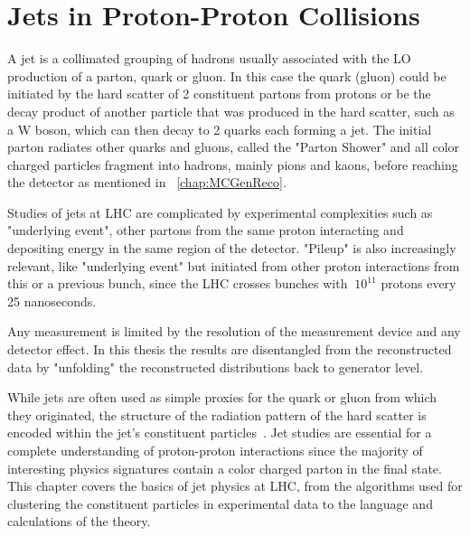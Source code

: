 



\chapter{Jets in Proton-Proton Collisions}%



A jet is a collimated grouping of hadrons usually associated with the LO production of a parton, quark or gluon. In this case the quark (gluon) could be initiated by the hard scatter of 2 constituent partons from protons or be the decay product of another particle that was produced in the hard scatter, such as a W boson, which can then decay to 2 quarks each forming a jet. The initial parton radiates other quarks and gluons, called the "Parton Shower" and all color charged particles fragment into hadrons, mainly pions and kaons,  before reaching the detector as mentioned in ~\ref{chap:MCGenReco}.

Studies of jets at LHC are complicated by experimental complexities such as "underlying event", other partons from the same proton interacting and depositing energy in the same region of the detector. "Pileup" is also increasingly relevant, like "underlying event" but initiated from other proton interactions from this or a previous bunch, since the LHC crosses bunches with $~10^{11}$ protons every 25 nanoseconds.



Any measurement is limited by the resolution of the measurement device and any detector effect. In this thesis the results are disentangled from the reconstructed data by "unfolding" the reconstructed distributions back to generator level.

While jets are often used as simple proxies for the quark or gluon from which they originated, the structure of the radiation pattern of the hard scatter is encoded within the jet's constituent particles~\cite{Asquith:2018igt}. Jet studies are essential for a complete understanding of proton-proton interactions since the majority of interesting physics signatures contain a color charged parton in the final state. This chapter covers the basics of jet physics at LHC, from the algorithms used for clustering the constituent particles in experimental data to the language and calculations of the theory.




